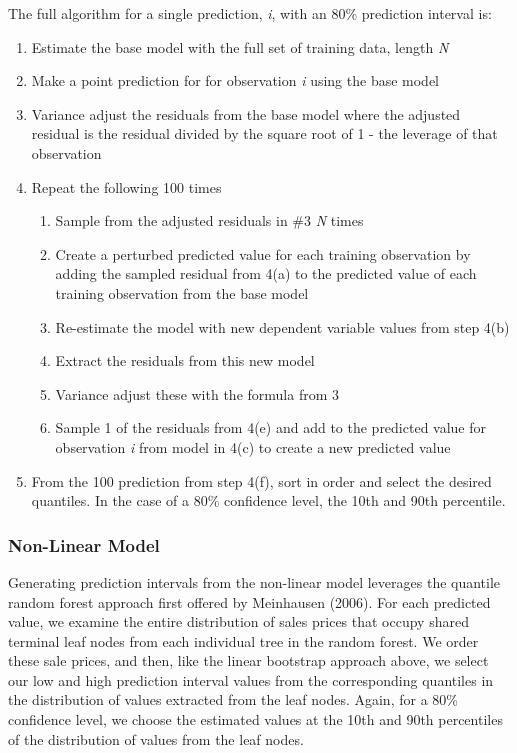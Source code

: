 \documentclass[colTwo]{anon}
\theoremstyle{definition}
\begin{document}
The full algorithm for a single prediction, \textit{i}, with an 80\% prediction interval is:
\begin{enumerate}
\item Estimate the base model with the full set of training data, length \textit{N}
\item Make a point prediction for for observation \textit{i} using the base model
\item Variance adjust the residuals from the base model where the adjusted residual is the residual divided by the square root of 1 - the leverage of that observation
\item Repeat the following 100 times
\begin{enumerate}
\item Sample from the adjusted residuals in \#3 \textit{N} times
\item Create a perturbed predicted value for each training observation by adding the sampled residual from 4(a) to the predicted value of each training observation from the base model
\item Re-estimate the model with new dependent variable values from step 4(b)
\item Extract the residuals from this new model
\item Variance adjust these with the formula from 3
\item Sample 1 of the residuals from 4(e) and add to the predicted value for observation \textit{i} from model in 4(c) to create a new predicted value
\end{enumerate}
\item From the 100 prediction from step 4(f), sort in order and select the desired quantiles.  In the case of a 80\% confidence level, the 10th and 90th percentile. 
\end{enumerate}

\subsubsection{Non-Linear Model}

Generating prediction intervals from the non-linear model leverages the quantile random forest approach first offered by Meinhausen (2006).  For each predicted value, we examine the entire distribution of sales prices that occupy shared terminal leaf nodes from each individual tree in the random forest.  We order these sale prices, and then, like the linear bootstrap approach above, we select our low and high prediction interval values from the corresponding quantiles in the distribution of values extracted from the leaf nodes. Again, for a 80\% confidence level, we choose the estimated values at the 10th and 90th percentiles of the distribution of values from the leaf nodes. 
\end{document}
